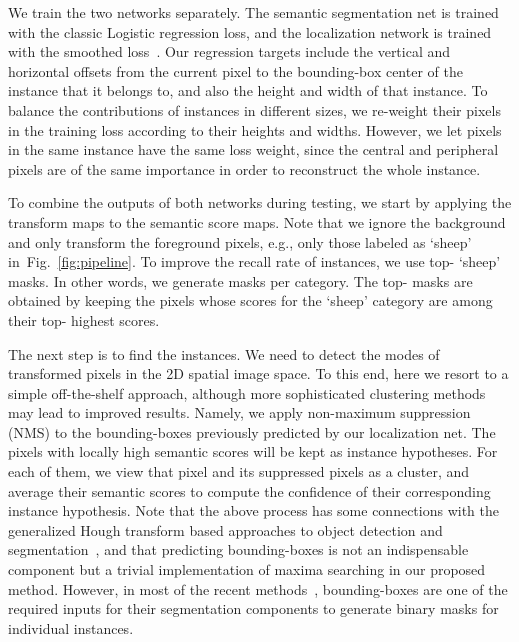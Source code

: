\documentclass{article}
\begin{document}
We train the two networks separately.
The semantic segmentation net is trained with the classic Logistic regression loss,
and the localization network is trained with the smoothed  loss~\cite{FastRCNN.ICCV.2015.Girshick}.
Our regression targets include the vertical and horizontal offsets from the current pixel to the bounding-box center of the instance that it belongs to,
and also the height and width of that instance.
To balance the contributions of instances in different sizes,
we re-weight their pixels in the training loss according to their heights and widths.
However, we let pixels in the same instance have the same loss weight,
since the central and peripheral pixels are of the same importance in order to reconstruct the whole instance.



To combine the outputs of both networks during testing, we start by applying the transform maps to the semantic score maps.
Note that we ignore the background and only transform the foreground pixels,
e.g., only those labeled as `sheep' in~Fig.~\ref{fig:pipeline}.
To improve the recall rate of instances, we use top- `sheep' masks.
In other words, we generate  masks per category.
The top- masks are  obtained by keeping the pixels whose scores for the `sheep' category are among their top- highest scores.





The next step is to find the instances.
We need to detect the modes of transformed pixels in the 2D spatial image space.
To this end, here we resort to a simple off-the-shelf approach, although more sophisticated clustering methods
may lead to improved results.
Namely, we apply non-maximum suppression (NMS) to the bounding-boxes previously predicted by our localization net.
The pixels with locally high semantic scores will be kept as instance hypotheses.
For each of them, we view that pixel and its suppressed pixels as a cluster,
and average their semantic scores to compute the confidence of their corresponding instance hypothesis.
Note that the above process has some connections with
the generalized Hough transform based approaches to object detection and segmentation~\cite{ISM.IJCV.2007.Leibe},
and that predicting bounding-boxes is not an indispensable component but a trivial
implementation of maxima searching in our proposed method.
However, in most of the recent methods~\cite{SDS.ECCV.2014.Hariharan,HyperColumn.CVPR.2015.Hariharan,MNC.CVPR.2016.Dai},
bounding-boxes are one of the required inputs for their segmentation components to generate binary masks for individual instances.
\end{document}
